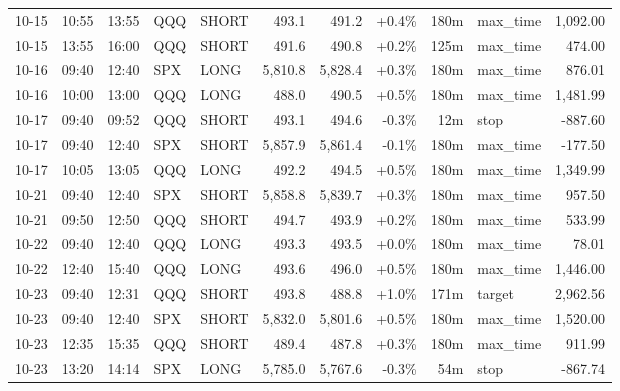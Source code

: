 \documentclass[11pt,a4paper,twoside]{article}
\begin{document}
\begin{center}
\begin{longtable}{>{\color{txtmain}}l l l l l r r r r >{\color{txtmain}}l r}
10-15 & 10:55 & 13:55 & QQQ & SHORT & 493.1 & 491.2 & \textcolor{wingreen}{+0.4\%} & 180m & max\_time & \textcolor{wingreen}{1,092.00} \\
10-15 & 13:55 & 16:00 & QQQ & SHORT & 491.6 & 490.8 & \textcolor{wingreen}{+0.2\%} & 125m & max\_time & \textcolor{wingreen}{474.00} \\
10-16 & 09:40 & 12:40 & SPX & LONG & 5,810.8 & 5,828.4 & \textcolor{wingreen}{+0.3\%} & 180m & max\_time & \textcolor{wingreen}{876.01} \\
10-16 & 10:00 & 13:00 & QQQ & LONG & 488.0 & 490.5 & \textcolor{wingreen}{+0.5\%} & 180m & max\_time & \textcolor{wingreen}{1,481.99} \\
10-17 & 09:40 & 09:52 & QQQ & SHORT & 493.1 & 494.6 & \textcolor{lossred}{-0.3\%} & 12m & stop & \textcolor{lossred}{-887.60} \\
10-17 & 09:40 & 12:40 & SPX & SHORT & 5,857.9 & 5,861.4 & \textcolor{lossred}{-0.1\%} & 180m & max\_time & \textcolor{lossred}{-177.50} \\
10-17 & 10:05 & 13:05 & QQQ & LONG & 492.2 & 494.5 & \textcolor{wingreen}{+0.5\%} & 180m & max\_time & \textcolor{wingreen}{1,349.99} \\
10-21 & 09:40 & 12:40 & SPX & SHORT & 5,858.8 & 5,839.7 & \textcolor{wingreen}{+0.3\%} & 180m & max\_time & \textcolor{wingreen}{957.50} \\
10-21 & 09:50 & 12:50 & QQQ & SHORT & 494.7 & 493.9 & \textcolor{wingreen}{+0.2\%} & 180m & max\_time & \textcolor{wingreen}{533.99} \\
10-22 & 09:40 & 12:40 & QQQ & LONG & 493.3 & 493.5 & \textcolor{wingreen}{+0.0\%} & 180m & max\_time & \textcolor{wingreen}{78.01} \\
10-22 & 12:40 & 15:40 & QQQ & LONG & 493.6 & 496.0 & \textcolor{wingreen}{+0.5\%} & 180m & max\_time & \textcolor{wingreen}{1,446.00} \\
10-23 & 09:40 & 12:31 & QQQ & SHORT & 493.8 & 488.8 & \textcolor{wingreen}{+1.0\%} & 171m & target & \textcolor{wingreen}{2,962.56} \\
10-23 & 09:40 & 12:40 & SPX & SHORT & 5,832.0 & 5,801.6 & \textcolor{wingreen}{+0.5\%} & 180m & max\_time & \textcolor{wingreen}{1,520.00} \\
10-23 & 12:35 & 15:35 & QQQ & SHORT & 489.4 & 487.8 & \textcolor{wingreen}{+0.3\%} & 180m & max\_time & \textcolor{wingreen}{911.99} \\
10-23 & 13:20 & 14:14 & SPX & LONG & 5,785.0 & 5,767.6 & \textcolor{lossred}{-0.3\%} & 54m & stop & \textcolor{lossred}{-867.74} \\

\end{longtable}
\end{center}
\end{document}
